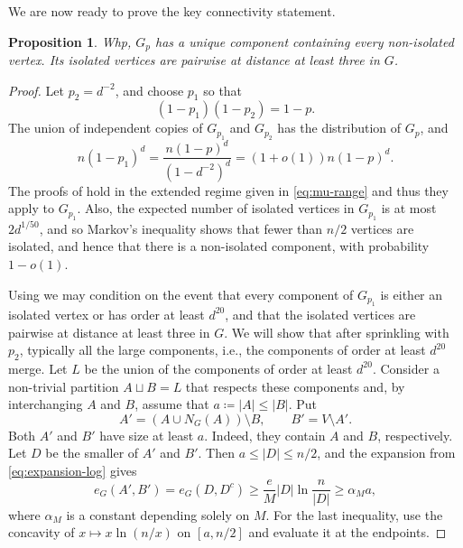 \documentclass[notitlepage]{scrartcl}
\newtheorem{proposition}[thm]{Proposition}
\begin{document}
We are now ready to prove the key connectivity statement.

\begin{proposition}\label{prop:unique-component}
Whp, $G_p$ has a unique component containing every non-isolated vertex.
Its isolated vertices are pairwise at distance at least three in $G$.
\end{proposition}

\begin{proof}
Let $p_2=d^{-2}$, and choose $p_1$ so that
\[
  (1-p_1)(1-p_2)=1-p.
\]
The union of independent copies of $G_{p_1}$ and $G_{p_2}$ has the distribution of $G_p$, and
\[
  n(1-p_1)^d=\frac{n(1-p)^d}{(1-d^{-2})^d}=(1+o(1))n (1-p)^d.
\]
The proofs of  hold in the extended regime given in \eqref{eq:mu-range} and thus they apply to $G_{p_1}$.
Also, the expected number of isolated vertices in $G_{p_1}$ is at most $2d^{1/50}$, and so Markov's inequality shows that fewer than $n/2$ vertices are isolated, and hence that there is a non-isolated component, with probability $1-o(1)$.

Using  we may condition on the event that every component of $G_{p_1}$ is either an isolated vertex or has order at least $d^{20}$, and that the isolated vertices are pairwise at distance at least three in $G$. We will show that after sprinkling with $p_2$, typically all the large components, i.e., the components of order at least $d^{20}$ merge.
Let $L$ be the union of the components of order at least $d^{20}$.
Consider a non-trivial partition $A\sqcup B=L$ that respects these components and, by interchanging $A$ and $B$, assume that $a\coloneqq |A|\le|B|$.
Put
\[
  A'=(A\cup N_G(A))\setminus B,
  \qquad B'=V\setminus A'.
\]
Both $A'$ and $B'$ have size at least $a$.
Indeed, they contain $A$ and $B$, respectively.
Let $D$ be the smaller of $A'$ and $B'$.
Then $a\le|D|\le n/2$, and the expansion from \eqref{eq:expansion-log} gives
\[
  e_G(A',B')=e_G(D,D^c)
  \ge \frac{e}{M}|D|\ln\frac{n}{|D|}
  \ge \alpha_Ma,
\]
where $\alpha_M$ is a constant depending solely on $M$.
For the last inequality, use the concavity of $x\mapsto x\ln(n/x)$ on $[a,n/2]$ and evaluate it at the endpoints.


\end{proof}
\end{document}
